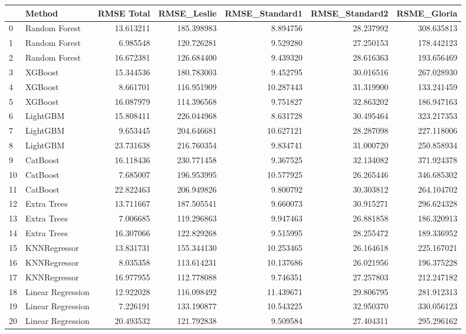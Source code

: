 \begin{tabular}{llrrrrr}
\toprule
{} &             Method &  RMSE Total &  RMSE\_Leslie &  RMSE\_Standard1 &  RMSE\_Standard2 &  RSME\_Gloria \\
\midrule
0  &      Random Forest &   13.613211 &   185.398983 &        8.894756 &       28.237992 &   308.635813 \\
1  &      Random Forest &    6.985548 &   120.726281 &        9.529280 &       27.250153 &   178.442123 \\
2  &      Random Forest &   16.672381 &   126.684400 &        9.439320 &       28.616363 &   193.656469 \\
3  &            XGBoost &   15.344536 &   180.783003 &        9.452795 &       30.016516 &   267.028930 \\
4  &            XGBoost &    8.661701 &   116.951909 &       10.287443 &       31.319900 &   133.241459 \\
5  &            XGBoost &   16.087979 &   114.396568 &        9.751827 &       32.863202 &   186.947163 \\
6  &           LightGBM &   15.808411 &   226.044968 &        8.631728 &       30.495464 &   323.217353 \\
7  &           LightGBM &    9.653445 &   204.646681 &       10.627121 &       28.287098 &   227.118006 \\
8  &           LightGBM &   23.731638 &   216.760354 &        9.834741 &       31.000720 &   250.858934 \\
9  &           CatBoost &   16.118436 &   230.771458 &        9.367525 &       32.134082 &   371.924378 \\
10 &           CatBoost &    7.685007 &   196.953995 &       10.577925 &       26.265446 &   346.685302 \\
11 &           CatBoost &   22.822463 &   206.949826 &        9.800792 &       30.303812 &   264.104702 \\
12 &        Extra Trees &   13.711667 &   187.505541 &        9.660073 &       30.915271 &   296.624328 \\
13 &        Extra Trees &    7.006685 &   119.296863 &        9.947463 &       26.881858 &   186.320913 \\
14 &        Extra Trees &   16.307066 &   122.829268 &        9.515995 &       28.255472 &   189.336952 \\
15 &       KNNRegressor &   13.831731 &   155.344130 &       10.253465 &       26.164618 &   225.167021 \\
16 &       KNNRegressor &    8.035358 &   113.614231 &       10.137686 &       26.021956 &   196.375228 \\
17 &       KNNRegressor &   16.977955 &   112.778088 &        9.746351 &       27.257803 &   212.247182 \\
18 &  Linear Regression &   12.922028 &   116.098492 &       11.439671 &       29.806795 &   281.912313 \\
19 &  Linear Regression &    7.226191 &   133.190877 &       10.543225 &       32.950370 &   330.056123 \\
20 &  Linear Regression &   20.493532 &   121.792838 &        9.509584 &       27.404311 &   295.296162 \\
\bottomrule
\end{tabular}
